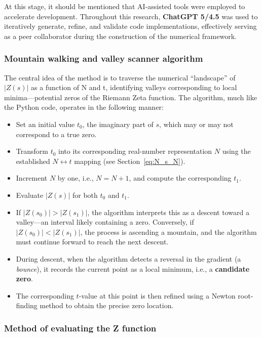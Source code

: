 \documentclass[11pt,a4paper]{article}
\begin{document}
At this stage, it should be mentioned that AI-assisted tools were employed to accelerate development.  
Throughout this research, \textbf{ChatGPT 5/4.5} was used to iteratively generate, refine, and validate code implementations, 
effectively serving as a peer collaborator during the construction of the numerical framework.

\subsubsection*{Mountain walking and valley scanner algorithm}

The central idea of the method is to traverse the numerical “landscape” of \( |Z(s)| \) as a function of N and t, identifying valleys corresponding to local minima—potential zeros of the Riemann Zeta function.  
The algorithm, much like the Python code, operates in the following manner:

\begin{itemize}
    \item Set an initial value \( t_0 \), the imaginary part of \( s \), which may or may not correspond to a true zero.
    \item Transform \( t_0 \) into its corresponding real-number representation \( N \) using the established \( N \leftrightarrow t \) mapping (see Section~\ref{eq:N_s_N}).
    \item Increment \( N \) by one, i.e., \( N = N + 1 \), and compute the corresponding \( t_1 \).
    \item Evaluate \( |Z(s)| \) for both \( t_0 \) and \( t_1 \).
    \item If \( |Z(s_0)| > |Z(s_1)| \), the algorithm interprets this as a descent toward a valley—an interval likely containing a zero.  
    Conversely, if \( |Z(s_0)| < |Z(s_1)| \), the process is ascending a mountain, and the algorithm must continue forward to reach the next descent.
    \item During descent, when the algorithm detects a reversal in the gradient (a \textit{bounce}), it records the current point as a local minimum, i.e., a \textbf{candidate zero}.
    \item The corresponding \( t \)-value at this point is then refined using a Newton root-finding method to obtain the precise zero location.
\end{itemize}

\subsubsection*{Method of evaluating the Z function}
\end{document}
